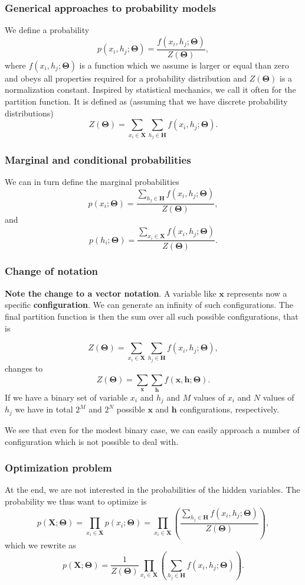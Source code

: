 \documentclass{beamer}
\begin{document}
\begin{frame}
\frametitle{Generical approaches to probability models}

We define a probability
\[
p(x_i,h_j;\bm{\Theta}) = \frac{f(x_i,h_j;\bm{\Theta})}{Z(\bm{\Theta})},
\]
where $f(x_i,h_j;\bm{\Theta})$ is a function which we assume is larger or
equal than zero and obeys all properties required for a probability
distribution and $Z(\bm{\Theta})$ is a normalization constant. Inspired by
statistical mechanics, we call it often for the partition function.
It is defined as (assuming that we have discrete probability distributions)
\[
Z(\bm{\Theta})=\sum_{x_i\in \bm{X}}\sum_{h_j\in \bm{H}} f(x_i,h_j;\bm{\Theta}).
\]
\end{frame}

\begin{frame}
\frametitle{Marginal and conditional probabilities}

We can in turn define the marginal probabilities
\[
p(x_i;\bm{\Theta}) = \frac{\sum_{h_j\in \bm{H}}f(x_i,h_j;\bm{\Theta})}{Z(\bm{\Theta})},
\]
and 
\[
p(h_i;\bm{\Theta}) = \frac{\sum_{x_i\in \bm{X}}f(x_i,h_j;\bm{\Theta})}{Z(\bm{\Theta})}.
\]
\end{frame}

\begin{frame}
\frametitle{Change of notation}

\textbf{Note the change to a vector notation}. A variable like $\bm{x}$
represents now a specific \textbf{configuration}. We can generate an infinity
of such configurations. The final partition function is then the sum
over all such possible configurations, that is

\[
Z(\bm{\Theta})=\sum_{x_i\in \bm{X}}\sum_{h_j\in \bm{H}} f(x_i,h_j;\bm{\Theta}),
\]
changes to
\[
Z(\bm{\Theta})=\sum_{\bm{x}}\sum_{\bm{h}} f(\bm{x},\bm{h};\bm{\Theta}).
\]
If we have a binary set of variable $x_i$ and $h_j$ and $M$ values of $x_i$ and $N$ values of $h_j$ we have in total $2^M$ and $2^N$ possible $\bm{x}$ and $\bm{h}$ configurations, respectively.

We see that even for the modest binary case, we can easily approach a
number of configuration which is not possible to deal with.
\end{frame}

\begin{frame}
\frametitle{Optimization problem}

At the end, we are not interested in the probabilities of the hidden variables. The probability we thus want to optimize is 
\[
p(\bm{X};\bm{\Theta})=\prod_{x_i\in \bm{X}}p(x_i;\bm{\Theta})=\prod_{x_i\in \bm{X}}\left(\frac{\sum_{h_j\in \bm{H}}f(x_i,h_j;\bm{\Theta})}{Z(\bm{\Theta})}\right),
\]
which we rewrite as
\[
p(\bm{X};\bm{\Theta})=\frac{1}{Z(\bm{\Theta})}\prod_{x_i\in \bm{X}}\left(\sum_{h_j\in \bm{H}}f(x_i,h_j;\bm{\Theta})\right).
\]
\end{frame}
\end{document}
